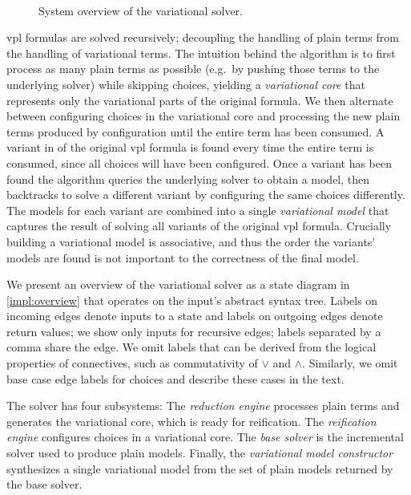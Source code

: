 ~\label{section:vsat:approach}
%
\begin{figure}
  \centering
    
    \caption{System overview of the variational solver.}%
    \label{impl:overview}
\end{figure}

\ac{vpl} formulas are solved recursively; decoupling the handling of plain terms
from the handling of variational terms.
%
The intuition behind the algorithm is to first process as many plain terms as
possible (e.g.\ by pushing those terms to the underlying solver) while skipping
choices, yielding a \emph{variational core} that represents only the variational
parts of the original formula. We then alternate between configuring choices in
the variational core and processing the new plain terms produced by
configuration until the entire term has been consumed.
%
A variant in of the original \ac{vpl} formula is found every time the entire
term is consumed, since all choices will have been configured. Once a variant
has been found the algorithm queries the underlying solver to obtain a model,
then backtracks to solve a different variant by configuring the same choices
differently. The models for each variant are combined into a single
\emph{variational model} that captures the result of solving all variants of the
original \ac{vpl} formula. Crucially building a variational model is
associative, and thus the order the variants' models are found is not important
to the correctness of the final model.

We present an overview of the variational solver as a state diagram in
\autoref{impl:overview} that operates on the input's abstract syntax tree.
Labels on incoming edges denote inputs to a state and labels on outgoing edges
denote return values; we show only inputs for recursive edges; labels separated
by a comma share the edge. We omit labels that can be derived from the logical
properties of connectives, such as commutativity of $\vee$ and $\wedge$.
Similarly, we omit base case edge labels for choices and describe these cases
in the text.

The solver has four subsystems: The \emph{reduction engine} processes plain
terms and generates the variational core, which is ready for reification.
The \emph{reification engine} configures choices in a variational core. The
\textit{base solver} is the incremental solver used to produce plain models.
Finally, the \emph{variational model constructor} synthesizes a single
variational model from the set of plain models returned by the base solver.

